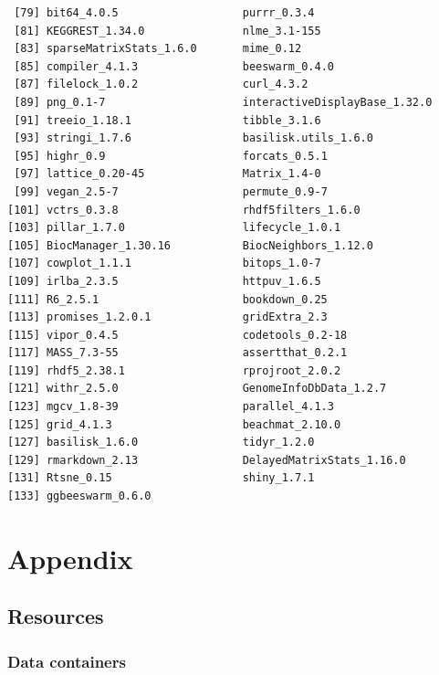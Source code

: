 \documentclass[
]{book}
\begin{document}
\begin{verbatim}
 [79] bit64_4.0.5                   purrr_0.3.4                  
 [81] KEGGREST_1.34.0               nlme_3.1-155                 
 [83] sparseMatrixStats_1.6.0       mime_0.12                    
 [85] compiler_4.1.3                beeswarm_0.4.0               
 [87] filelock_1.0.2                curl_4.3.2                   
 [89] png_0.1-7                     interactiveDisplayBase_1.32.0
 [91] treeio_1.18.1                 tibble_3.1.6                 
 [93] stringi_1.7.6                 basilisk.utils_1.6.0         
 [95] highr_0.9                     forcats_0.5.1                
 [97] lattice_0.20-45               Matrix_1.4-0                 
 [99] vegan_2.5-7                   permute_0.9-7                
[101] vctrs_0.3.8                   rhdf5filters_1.6.0           
[103] pillar_1.7.0                  lifecycle_1.0.1              
[105] BiocManager_1.30.16           BiocNeighbors_1.12.0         
[107] cowplot_1.1.1                 bitops_1.0-7                 
[109] irlba_2.3.5                   httpuv_1.6.5                 
[111] R6_2.5.1                      bookdown_0.25                
[113] promises_1.2.0.1              gridExtra_2.3                
[115] vipor_0.4.5                   codetools_0.2-18             
[117] MASS_7.3-55                   assertthat_0.2.1             
[119] rhdf5_2.38.1                  rprojroot_2.0.2              
[121] withr_2.5.0                   GenomeInfoDbData_1.2.7       
[123] mgcv_1.8-39                   parallel_4.1.3               
[125] grid_4.1.3                    beachmat_2.10.0              
[127] basilisk_1.6.0                tidyr_1.2.0                  
[129] rmarkdown_2.13                DelayedMatrixStats_1.16.0    
[131] Rtsne_0.15                    shiny_1.7.1                  
[133] ggbeeswarm_0.6.0             
\end{verbatim}

\hypertarget{part-appendix}{%
\part{Appendix}\label{part-appendix}}

\hypertarget{resources}{%
\chapter{Resources}\label{resources}}

\hypertarget{data-containers-1}{%
\section{Data containers}\label{data-containers-1}}
\end{document}

